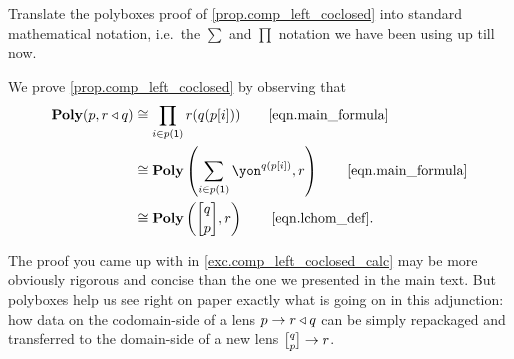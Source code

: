 \documentclass[Book-Poly]{subfiles}
\begin{document}
\begin{exercise} \label{exc.comp_left_coclosed_calc}
Translate the polyboxes proof of \cref{prop.comp_left_coclosed} into standard mathematical notation, i.e.\ the $\sum$ and $\prod$ notation we have been using up till now.
\begin{solution}
We prove \cref{prop.comp_left_coclosed} by observing that
\begin{align*}
    \poly(p,r\tri q)&\iso\prod_{i\in p(\1)}r(q(p[i])) \tag*{\eqref{eqn.main_formula}} \\
    &\iso\poly\left(\sum_{i\in p(\1)}\yon^{q(p[i])}, r\right) \tag*{\eqref{eqn.main_formula}} \\
    &\iso\poly\left(\lchom{q}{p}, r\right) \tag*{\eqref{eqn.lchom_def}}.
\end{align*}
\end{solution}
\end{exercise}

\begin{remark}
The proof you came up with in \cref{exc.comp_left_coclosed_calc} may be more obviously rigorous and concise than the one we presented in the main text.
But polyboxes help us see right on paper exactly what is going on in this adjunction: how data on the codomain-side of a lens $p\to r\mathbin{\triangleleft} q$ can be simply repackaged and transferred to the domain-side of a new lens $\lchom{q}{p}\to r$.
\end{remark}
\end{document}
